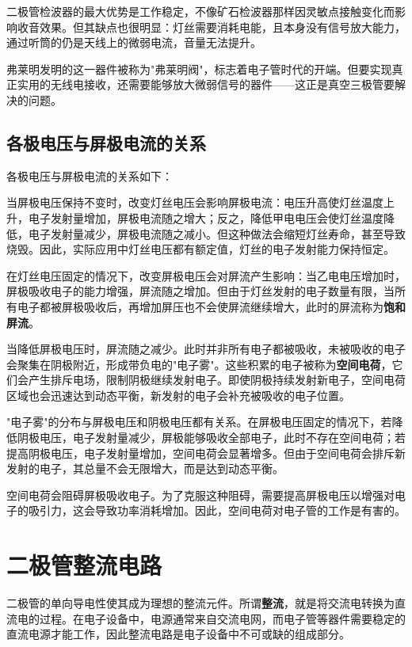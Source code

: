 \documentclass[12pt,UTF8]{ctexbook}
\begin{document}
二极管检波器的最大优势是工作稳定，不像矿石检波器那样因灵敏点接触变化而影响收音效果。但其缺点也很明显：灯丝需要消耗电能，且本身没有信号放大能力，通过听筒的仍是天线上的微弱电流，音量无法提升。

弗莱明发明的这一器件被称为"弗莱明阀"，标志着电子管时代的开端。但要实现真正实用的无线电接收，还需要能够放大微弱信号的器件——这正是真空三极管要解决的问题。

\section{各极电压与屏极电流的关系}

各极电压与屏极电流的关系如下：

当屏极电压保持不变时，改变灯丝电压会影响屏极电流：电压升高使灯丝温度上升，电子发射量增加，屏极电流随之增大；反之，降低甲电电压会使灯丝温度降低，电子发射量减少，屏极电流随之减小。但这种做法会缩短灯丝寿命，甚至导致烧毁。因此，实际应用中灯丝电压都有额定值，灯丝的电子发射能力保持恒定。

在灯丝电压固定的情况下，改变屏极电压会对屏流产生影响：当乙电电压增加时，屏极吸收电子的能力增强，屏流随之增加。但由于灯丝发射的电子数量有限，当所有电子都被屏极吸收后，再增加屏压也不会使屏流继续增大，此时的屏流称为\textbf{饱和屏流}。

当降低屏极电压时，屏流随之减少。此时并非所有电子都被吸收，未被吸收的电子会聚集在阴极附近，形成带负电的"电子雾"。这些积累的电子被称为\textbf{空间电荷}，它们会产生排斥电场，限制阴极继续发射电子。即使阴极持续发射新电子，空间电荷区域也会迅速达到动态平衡，新发射的电子会补充被吸收的电子位置。

"电子雾"的分布与屏极电压和阴极电压都有关系。在屏极电压固定的情况下，若降低阴极电压，电子发射量减少，屏极能够吸收全部电子，此时不存在空间电荷；若提高阴极电压，电子发射量增加，空间电荷会显著增多。但由于空间电荷会排斥新发射的电子，其总量不会无限增大，而是达到动态平衡。

空间电荷会阻碍屏极吸收电子。为了克服这种阻碍，需要提高屏极电压以增强对电子的吸引力，这会导致功率消耗增加。因此，空间电荷对电子管的工作是有害的。

\chapter{二极管整流电路}

二极管的单向导电性使其成为理想的整流元件。所谓\textbf{整流}，就是将交流电转换为直流电的过程。在电子设备中，电源通常来自交流电网，而电子管等器件需要稳定的直流电源才能工作，因此整流电路是电子设备中不可或缺的组成部分。
\end{document}
